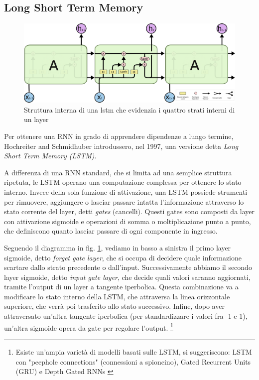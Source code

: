 \subsection{Long Short Term Memory}
\begin{figure}[ht]
	\centering
	\includegraphics{img/lstm_struct.png}
	\caption{Struttura interna di una lstm che evidenzia i quattro strati interni di un layer}
	\label{fig:1.9}
\end{figure}
Per ottenere una RNN in grado di apprendere dipendenze a lungo termine, Hochreiter and Schmidhuber \cite{vanishing} introdussero, nel 1997, una versione detta \textit{Long Short Term Memory (LSTM)}.

A differenza di una RNN standard, che si limita ad una semplice struttura ripetuta, le LSTM operano una computazione complessa per ottenere lo stato interno. Invece della sola funzione di attivazione, una LSTM possiede strumenti per rimuovere, aggiungere o lasciar passare intatta l'informazione attraverso lo stato corrente del layer, detti \textit{gates} (cancelli). Questi gates sono composti da layer con attivazione sigmoide e operazioni di somma o moltiplicazione punto a punto, che definiscono quanto lasciar passare di ogni componente in ingresso.

Seguendo il diagramma in fig. \ref{fig:1.9}, vediamo in basso a sinistra il primo layer sigmoide, detto \textit{forget gate layer}, che si occupa di decidere quale informazione scartare dallo strato precedente o dall'input. Successivamente abbiamo il secondo layer sigmoide, detto \textit{input gate layer}, che decide quali valori saranno aggiornati, tramite l'output di un layer a tangente iperbolica. Questa combinazione va a modificare lo stato interno della LSTM, che attraversa la linea orizzontale superiore, che verrà poi trasferito allo stato successivo. Infine, dopo aver attraversato un'altra tangente iperbolica (per standardizzare i valori fra -1 e 1), un'altra sigmoide opera da gate per regolare l'output. \footnote{Esiste un'ampia varietà di modelli basati sulle LSTM, si suggeriscono: LSTM con "peephole connections" \cite{peephole} (connessioni a spioncino), Gated Recurrent Units (GRU) \cite{GRU} e Depth Gated RNNs \cite{DGRNN}}
